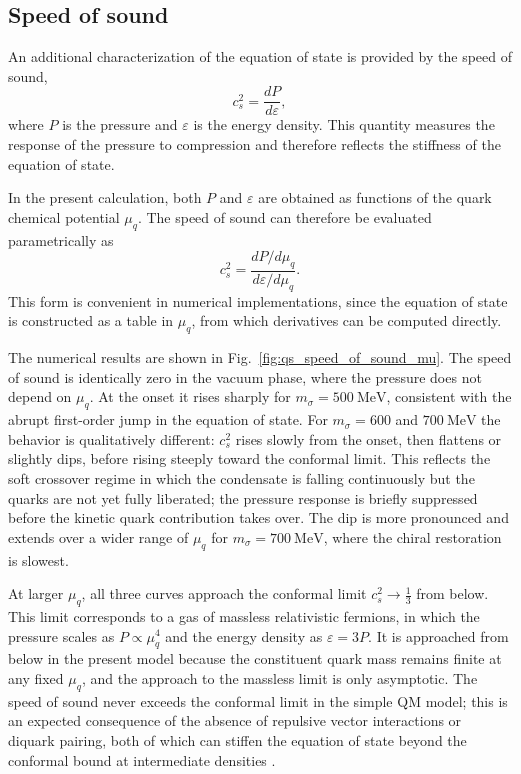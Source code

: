 \subsection*{Speed of sound}

An additional characterization of the equation of state is provided by
the speed of sound,
\begin{equation}
c_s^2 = \frac{dP}{d\varepsilon},
\end{equation}
where \(P\) is the pressure and \(\varepsilon\) is the energy density.
This quantity measures the response of the pressure to compression and
therefore reflects the stiffness of the equation of state.

In the present calculation, both \(P\) and \(\varepsilon\) are obtained
as functions of the quark chemical potential \(\mu_q\). The speed of
sound can therefore be evaluated parametrically as
\begin{equation}
c_s^2
=
\frac{dP/d\mu_q}{d\varepsilon/d\mu_q}.
\end{equation}
This form is convenient in numerical implementations, since the
equation of state is constructed as a table in \(\mu_q\), from which
derivatives can be computed directly.

The numerical results are shown in
Fig.~\ref{fig:qs_speed_of_sound_mu}. The speed of sound is
identically zero in the vacuum phase, where the pressure does not
depend on $\mu_q$. At the onset it rises sharply for
$m_\sigma = 500~\mathrm{MeV}$, consistent with the abrupt
first-order jump in the equation of state. 
For $m_\sigma = 600$ and $700~\mathrm{MeV}$ the
behavior is qualitatively different: $c_s^2$ rises slowly from
the onset, then flattens or slightly dips,
before rising steeply toward the conformal limit. This reflects
the soft crossover regime in which the condensate is falling
continuously but the quarks are not yet fully liberated; the
pressure response is briefly suppressed before the kinetic quark
contribution takes over. The dip is more pronounced and extends over
a wider range of $\mu_q$ for $m_\sigma = 700~\mathrm{MeV}$, where
the chiral restoration is slowest.

At larger $\mu_q$, all three curves approach the conformal limit
$c_s^2 \to \frac{1}{3}$ from below. This limit corresponds to a gas of
massless relativistic fermions, in which the pressure scales as
$P \propto \mu_q^4$ and the energy density as $\varepsilon = 3P$.
It is approached from below in the present model because the
constituent quark mass remains finite at any fixed $\mu_q$, and the
approach to the massless limit is only asymptotic. The speed of sound
never exceeds the conformal limit in the simple QM model; this is an expected
consequence of the absence of repulsive vector interactions or
diquark pairing, both of which can stiffen the equation of state
beyond the conformal bound at intermediate densities
\cite{Andersen2024}.

